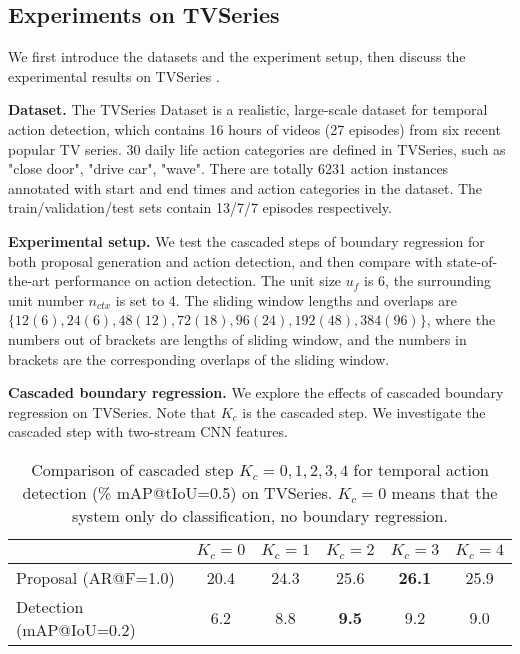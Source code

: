\documentclass{bmvc2k}
\begin{document}
\subsection{Experiments on TVSeries}
We first introduce the datasets and the experiment setup, then discuss the experimental results on TVSeries \cite{de2016online}.

\textbf{Dataset.} The TVSeries Dataset \cite{de2016online} is a realistic, large-scale dataset for temporal action detection, which contains 16 hours of videos (27 episodes) from six recent popular TV series. 30 daily life action categories are defined in TVSeries, such as "close door", "drive car", "wave". There are totally 6231 action instances annotated with start and end times and action categories in the dataset. The train/validation/test sets contain 13/7/7 episodes respectively.

\textbf{Experimental setup.} We test the cascaded steps of boundary regression for both proposal generation and action detection, and then compare with state-of-the-art performance on action detection. The unit size $u_f$ is 6, the surrounding unit number $n_{ctx}$ is set to 4. The sliding window lengths and overlaps are $\{12(6),24(6),48(12),72(18),96(24),192(48),384(96)\}$, where the numbers out of brackets are lengths of sliding window, and the numbers in brackets are the corresponding overlaps of the sliding window.



\textbf{Cascaded boundary regression.}
We explore the effects of cascaded boundary regression on TVSeries. Note that $K_c$ is the cascaded step. We investigate the cascaded step with two-stream CNN features.

\begin{table}[h]\small
\centering
\caption{Comparison of cascaded step $K_c = 0,1,2,3,4 $ for temporal action detection (\% mAP@tIoU=0.5) on TVSeries. $K_c = 0$ means that the system only do classification, no boundary regression.}
\label{cas-tv}
\begin{tabular}{l|c|c|c|c|c}
\hline
           & \multicolumn{1}{c|}{$K_c=0$} & $K_c=1$ & \multicolumn{1}{c|}{$K_c=2$} & \multicolumn{1}{c|}{$K_c=3$} & \multicolumn{1}{c}{$K_c=4$} \\ \hline
Proposal (AR@F=1.0)        & 20.4 &   24.3  &      25.6      &       \textbf{26.1}       &     25.9      \\ \hline
Detection (mAP@IoU=0.2) & 6.2 &   8.8  &      \textbf{9.5}   &        9.2      &        9.0       \\ \hline
\end{tabular}
\end{table}
\end{document}

